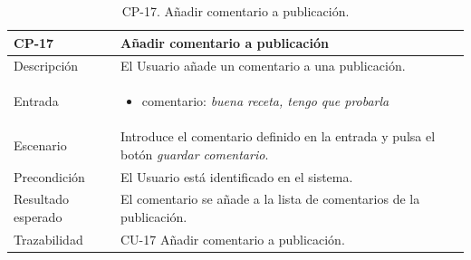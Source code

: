                 \begin{table}[H]
                    \centering
                    \begin{tabularx}{1\textwidth} { 
                        | >{\raggedright\arraybackslash}X 
                        | >{\raggedright\arraybackslash}X 
                        | >{\raggedright\arraybackslash}X 
                        |  }
                    \hline
                    \textbf{CP-17}     & \textbf{Añadir comentario a publicación}                             \\ \hline
                    Descripción        & El Usuario añade un comentario a una publicación.      \\ \hline
                    Entrada            & \begin{itemize}
                        \item comentario: \textit{buena receta, tengo que probarla}
                    \end{itemize} \\ \hline
                    Escenario          & Introduce el comentario definido en la entrada y pulsa el botón \textit{guardar comentario}.                             \\ \hline
                    Precondición          & El Usuario está identificado en el sistema.                             \\ \hline
                    
                    Resultado esperado & El comentario se añade a la lista de comentarios de la publicación. \\ \hline
                    Trazabilidad & CU-17 Añadir comentario a publicación.\\ \hline
                \end{tabularx}
                \caption{CP-17. Añadir comentario a publicación.}
                \label{table:CP-17}
                    \end{table}




